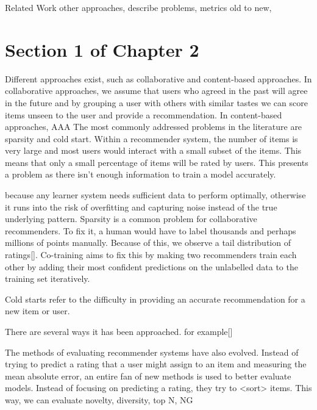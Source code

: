 Related Work
other approaches, describe problems, metrics old to new, 


\section{Section 1 of Chapter 2}
Different approaches exist, such as collaborative and content-based approaches. In collaborative approaches, we assume that users who agreed in the past will agree in the future and by grouping a user with others with similar tastes we can score items unseen to the user and provide a recommendation. In content-based approaches, AAA
The most commonly addressed problems in the literature are sparsity and cold start. Within a recommender system, the number of items is very large and most users would interact with a small subset of the items. This means that only a small percentage of items will be rated by users. This presents a problem as there isn’t enough information to train a model accurately.  

because any learner system needs sufficient data to perform optimally, otherwise it runs into the risk of overfitting and capturing noise instead of the true underlying pattern. Sparsity is a common problem for collaborative recommenders. To fix it, a human would have to label thousands and perhaps millions of points manually. Because of this, we observe a tail distribution of ratings[]. Co-training aims to fix this by making two recommenders train each other by adding their most confident predictions on the unlabelled data to the training set iteratively.


Cold starts refer to the difficulty in providing an accurate recommendation for a new item or user. 

 There are several ways it has been approached.  for example[] 

The methods of evaluating recommender systems have also evolved. Instead of trying to predict a rating that a user might assign to an item and measuring the mean absolute error, an entire fan of new methods is used to better evaluate models. Instead of focusing on predicting a rating, they try to <sort> items. This way, we can evaluate novelty, diversity, top N, NG 
